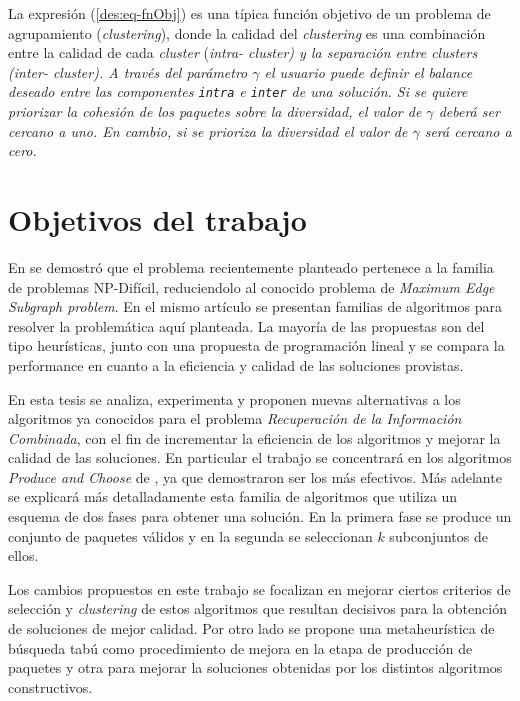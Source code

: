 La expresión (\ref{des:eq-fnObj}) es una típica función objetivo de un problema de agrupamiento ({\em clustering}), donde la calidad del {\em clustering} es una combinación entre la calidad de cada {\em cluster} (\em{intra}- cluster) y la separación entre {\em clusters} (\em{inter}- cluster). A través del parámetro $\gamma$ el usuario puede definir el balance deseado entre las componentes \texttt{intra} e \texttt{inter} de una solución. Si se quiere priorizar la cohesión de los paquetes sobre la diversidad, el  valor de $\gamma$ deberá ser cercano a uno. En cambio, si se prioriza la diversidad el valor de $\gamma$ será cercano a cero.

\section{Objetivos del trabajo}
En \cite{journals/tkde/Amer-YahiaBCFMZ14} se demostró que el problema recientemente planteado pertenece a la familia de problemas NP-Difícil, reduciendolo al conocido problema de {\em Maximum Edge Subgraph problem}. En el mismo artículo se presentan familias de algoritmos para resolver la problemática aquí planteada. La mayoría de las propuestas son del tipo heurísticas, junto con una propuesta de programación lineal y se compara la performance en cuanto a la eficiencia y calidad de las soluciones provistas.

En esta tesis se analiza, experimenta y proponen nuevas alternativas a los algoritmos ya conocidos para el problema {\em Recuperación de la Información Combinada}, con el fin de incrementar la eficiencia de los algoritmos y mejorar la calidad de las soluciones. En particular el trabajo se concentrará en los algoritmos {\em Produce and Choose} de \cite{journals/tkde/Amer-YahiaBCFMZ14}, ya que demostraron ser los más efectivos. Más adelante se explicará más detalladamente esta familia de algoritmos que utiliza un esquema de dos fases para obtener una solución. En la primera fase se produce un conjunto de paquetes válidos y en la segunda se seleccionan $k$ subconjuntos de ellos.

Los cambios propuestos en este trabajo se focalizan en mejorar ciertos criterios de selección y {\em clustering} de estos algoritmos que resultan decisivos para la obtención de soluciones de mejor calidad. Por otro lado se propone una metaheurística de búsqueda tabú como procedimiento de mejora en la etapa de producción de paquetes y otra para mejorar la soluciones obtenidas por los distintos algoritmos constructivos.

